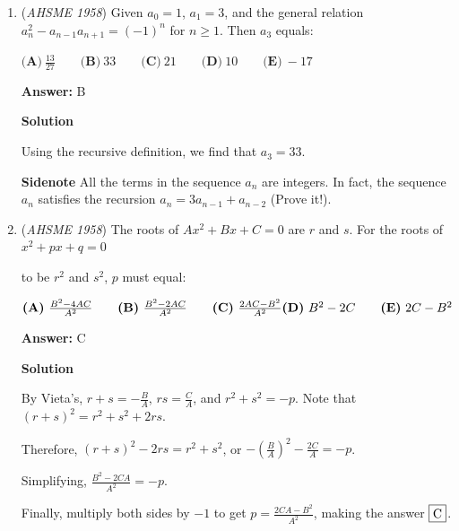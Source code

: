 \begin{enumerate}
 We can find all roots $x$ by setting $|x| = y$. This gives us the equation $y^2+y-6=0$, which has the solutions $y=-3, 2$. However, $|x|$ cannot equal $-3$, so the roots for $x$ are $2$ and $-2$. The sum of the two roots is $0$, making the answer $\fbox{C}$.

 


	\item (\textit{AHSME 1958}) Given $a_0 = 1$, $a_1 = 3$, and the general relation $a_n^2 - a_{n - 1}a_{n + 1} = (-1)^n$ for $n \ge 1$. Then $a_3$ equals:


 $\textbf{(A)}\ \frac{13}{27}\qquad  \textbf{(B)}\ 33\qquad  \textbf{(C)}\ 21\qquad  \textbf{(D)}\ 10\qquad  \textbf{(E)}\ -17$

 \textbf{Answer: }B



\textbf{Solution}

Using the recursive definition, we find that $a_3=33$.

 \textbf{Sidenote} All the terms in the sequence $a_n$ are integers. In fact, the sequence $a_n$ satisfies the recursion $a_n=3a_{n-1}+a_{n-2}$ (Prove it!).

 


	\item (\textit{AHSME 1958}) The roots of $Ax^2 + Bx + C = 0$ are $r$ and $s$. For the roots of
$x^2+px +q =0$


 to be $r^2$ and $s^2$, $p$ must equal:


 $\textbf{(A)}\ \frac{B^2 - 4AC}{A^2}\qquad  \textbf{(B)}\ \frac{B^2 - 2AC}{A^2}\qquad  \textbf{(C)}\ \frac{2AC - B^2}{A^2}\qquad \\ \vspace{0.1in}\\ \textbf{(D)}\ B^2 - 2C\qquad  \textbf{(E)}\ 2C - B^2$

 \textbf{Answer: }C



\textbf{Solution}

By Vieta's, $r + s = -\frac{B}{A}$, $rs = \frac{C}{A}$, and $r^2 + s^2 = -p$. Note that $(r+s)^2 = r^2 + s^2 + 2rs$.

 Therefore, $(r + s)^2 - 2rs = r^2 + s^2$, or $-\left(\frac{B}{A}\right)^2 - \frac{2C}{A} = -p$.

 Simplifying, $\frac{B^2 - 2CA}{A^2} = -p$. 

 Finally, multiply both sides by $-1$ to get $p = \frac{2CA - B^2}{A^2}$, making the answer $\fbox{C}$.

 



\end{enumerate}
